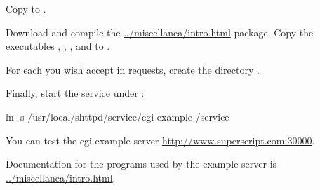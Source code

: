 \documentclass{book}
\begin{document}
Copy  to
.

Download and compile the \href{miscellanea}{../miscellanea/intro.html}
package.  Copy the executables , ,
, and  to
.

For each  you wish accept in requests, create the
directory
.

Finally, start the service under :
\begin{code}
  ln -s /usr/local/shttpd/service/cgi-example /service
\end{code}

You can test the cgi-example server
\href{here}{http://www.superscript.com:30000}.

Documentation for the programs used by the example server is
\href{here}{../miscellanea/intro.html}.
\end{document}
